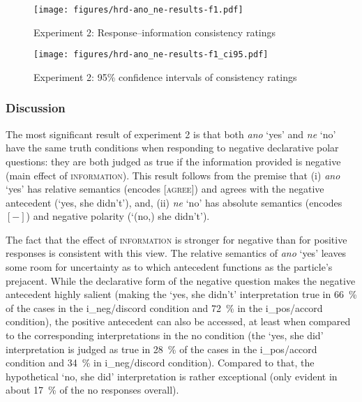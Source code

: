 \documentclass[output=paper,colorlinks,citecolor=brown]{langscibook}
\begin{document}
\begin{figure}
    \texttt{[image: figures/hrd-ano\_ne-results-f1.pdf]}
    \caption{Experiment 2: Response--information consistency ratings}
    \label{hrdsim:fig:exp2-results}
\end{figure}

\begin{figure}
    \texttt{[image: figures/hrd-ano\_ne-results-f1\_ci95.pdf]}
    \caption{Experiment 2: 95\% confidence intervals of consistency ratings}
    \label{hrdsim:fig:emmeans-f1}
\end{figure}

\subsubsection{Discussion}

The most significant result of experiment 2 is that both \textit{ano} `yes' and \textit{ne} `no' have the same truth conditions when responding to negative declarative polar questions: they are both judged as true if the information provided is negative (main effect of \textsc{information}). This result follows from the premise that (i) \textit{ano} `yes' has relative semantics (encodes \textsc{[agree]}) and agrees with the negative antecedent (`yes, she didn't'), and, (ii) \textit{ne} `no' has absolute semantics (encodes $[-]$) and negative polarity (`(no,) she didn't').

The fact that the effect of \textsc{information} is stronger for negative than for positive responses is consistent with this view. The relative semantics of \textit{ano} `yes' leaves some room for uncertainty as to which antecedent functions as the particle's prejacent. While the declarative form of the negative question makes the negative antecedent highly salient (making the `yes, she didn't' interpretation true in \qty{66}{\percent} of the cases in the \textsf{i\_neg/discord} condition and \qty{72}{\percent} in the \textsf{i\_pos/accord} condition), the positive antecedent can also be accessed, at least when compared to the corresponding interpretations in the \textsf{no} condition (the `yes, she did' interpretation is judged as true in \qty{28}{\percent} of the cases in the \textsf{i\_pos/accord} condition and \qty{34}{\percent} in \textsf{i\_neg/discord} condition). Compared to that, the hypothetical `no, she did' interpretation is rather exceptional (only evident in about \qty{17}{\percent} of the \textsf{no} responses overall).
\end{document}
